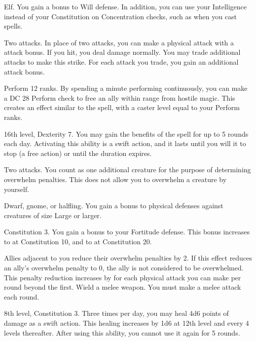 \featpre Elf.
\featben You gain a  bonus to Will defense.
In addition, you can use your Intelligence instead of your Constitution on Concentration checks, such as when you cast spells.

\featpre Two attacks.
\featben In place of two attacks, you can make a physical attack with a  attack bonus.
If you hit, you deal damage normally.
You may trade additional attacks to make this strike.
For each attack you trade, you gain an additional  attack bonus.

\featpre Perform 12 ranks.
\featben By spending a minute performing continuously, you can make a DC 28 Perform check to free an ally within \rngmed range from hostile magic.
This creates an effect similar to the 
spell, with a caster level equal to your Perform ranks.

\featpres 16th level, Dexterity 7.
\featben You may gain the benefits of the 
spell for up to 5 rounds each day.
Activating this ability is a swift action, and it lasts until you will it to stop (a free action) or until the duration expires.

\featpre Two attacks.
\featben You count as one additional creature for the purpose of determining overwhelm penalties.
This does not allow you to overwhelm a creature by yourself.

\featpres Dwarf, gnome, or halfling.
\featben You gain a  bonus to physical defenses against creatures of size Large or larger.

\featpre Constitution 3.
\featben You gain a  bonus to your Fortitude defense.
This bonus increases to  at Constitution 10, and to  at Constitution 20.

\featben Allies adjacent to you reduce their overwhelm penalties by 2.
If this effect reduces an ally's overwhelm penalty to 0, the ally is not considered to be overwhelmed.
This penalty reduction increases by  for each physical attack you can make per round beyond the first.
\stylereq Wield a melee weapon.
You must make a melee attack each round.

\featpres 8th level, Constitution 3.
\featben Three times per day, you may heal 4d6 points of damage as a swift action.
This healing increases by 1d6 at 12th level and every 4 levels thereafter.
After using this ability, you cannot use it again for 5 rounds.

